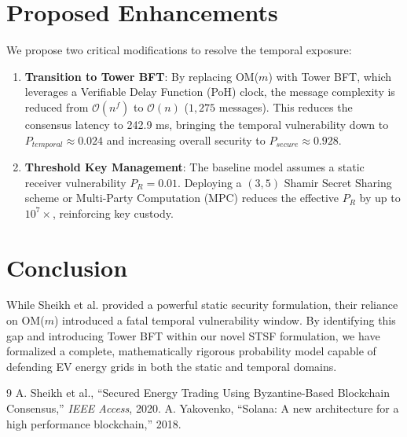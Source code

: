 \documentclass[10pt,twocolumn,letterpaper]{article}
\begin{document}
\section{Proposed Enhancements}
We propose two critical modifications to resolve the temporal exposure:
\begin{enumerate}
    \item \textbf{Transition to Tower BFT}: By replacing OM($m$) with Tower BFT, which leverages a Verifiable Delay Function (PoH) clock, the message complexity is reduced from $\mathcal{O}(n^f)$ to $\mathcal{O}(n)$ ($1{,}275$ messages). This reduces the consensus latency to 242.9 ms, bringing the temporal vulnerability down to $P_{temporal} \approx 0.024$ and increasing overall security to $P_{secure} \approx 0.928$.
    \item \textbf{Threshold Key Management}: The baseline model assumes a static receiver vulnerability $P_R = 0.01$. Deploying a $(3,5)$ Shamir Secret Sharing scheme or Multi-Party Computation (MPC) reduces the effective $P_R$ by up to $10^7\times$, reinforcing key custody.
\end{enumerate}

\section{Conclusion}
While Sheikh et al. provided a powerful static security formulation, their reliance on OM($m$) introduced a fatal temporal vulnerability window. By identifying this gap and introducing Tower BFT within our novel STSF formulation, we have formalized a complete, mathematically rigorous probability model capable of defending EV energy grids in both the static and temporal domains.

\begin{thebibliography}{9}
 A. Sheikh et al., ``Secured Energy Trading Using Byzantine-Based Blockchain Consensus,'' \emph{IEEE Access}, 2020.
 A. Yakovenko, ``Solana: A new architecture for a high performance blockchain,'' 2018.
\end{thebibliography}
\end{document}
